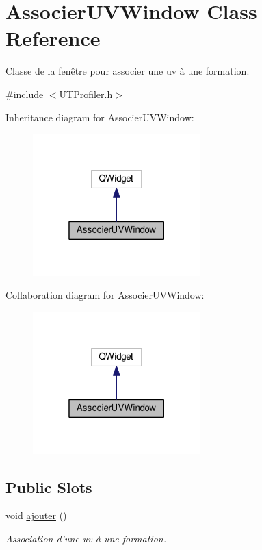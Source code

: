 \hypertarget{class_associer_u_v_window}{\section{Associer\-U\-V\-Window Class Reference}
\label{class_associer_u_v_window}
}


Classe de la fenêtre pour associer une uv à une formation.  




{\ttfamily \#include $<$U\-T\-Profiler.\-h$>$}



Inheritance diagram for Associer\-U\-V\-Window\-:
\nopagebreak
\begin{figure}[H]
\begin{center}
\leavevmode
\includegraphics[width=184pt]{class_associer_u_v_window__inherit__graph}
\end{center}
\end{figure}


Collaboration diagram for Associer\-U\-V\-Window\-:
\nopagebreak
\begin{figure}[H]
\begin{center}
\leavevmode
\includegraphics[width=184pt]{class_associer_u_v_window__coll__graph}
\end{center}
\end{figure}
\subsection*{Public Slots}
\begin{DoxyCompactItemize}
\item 
\hypertarget{class_associer_u_v_window_a0a317e5f5fc2a182d181d642a7cd8d6d}{void \hyperlink{class_associer_u_v_window_a0a317e5f5fc2a182d181d642a7cd8d6d}{ajouter} ()}\label{class_associer_u_v_window_a0a317e5f5fc2a182d181d642a7cd8d6d}

\begin{DoxyCompactList}\small\item\em Association d'une uv à une formation. \end{DoxyCompactList}\end{DoxyCompactItemize}
